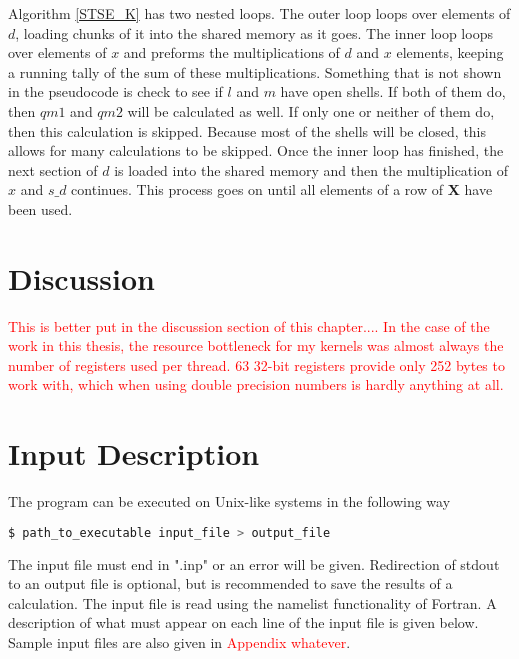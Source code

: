 \documentclass[12pt]{report}
\newcommand{\notetodylan}[1]{\textcolor{red}{#1}} %
\begin{document}
Algorithm \ref{STSE_K} has two nested loops. The outer loop loops over elements of $d$, loading chunks of it into the shared memory as it goes. The inner loop loops over elements of $x$ and preforms the multiplications of $d$ and $x$ elements, keeping a running tally of the sum of these multiplications. Something that is not shown in the pseudocode is check to see if $l$ and $m$ have open shells. If both of them do, then $qm1$ and $qm2$ will be calculated as well. If only one or neither of them do, then this calculation is skipped. Because most of the shells will be closed, this allows for many calculations to be skipped. Once the inner loop has finished, the next section of $d$ is loaded into the shared memory and then the multiplication of $x$ and $s\_d$ continues. This process goes on until all elements of a row of \textbf{X} have been used.

\section{Discussion}

\notetodylan{This is better put in the discussion section of this chapter.... In the case of the work in this thesis, the resource bottleneck for my kernels was almost always the number of registers used per thread. 63 32-bit registers provide only 252 bytes to work with, which when using double precision numbers is hardly anything at all.}

\section{Input Description}\label{inp_des}
The program can be executed on Unix-like systems in the following way
\begin{lstlisting}[language=bash]
	$ path_to_executable input_file > output_file
\end{lstlisting}

The input file must end in ".inp" or an error will be given. Redirection of stdout to an output file is optional, but is recommended to save the results of a calculation. The input file is read using the namelist functionality of Fortran. A description of what must appear on each line of the input file is given below. Sample input files are also given in \notetodylan{Appendix whatever}.
\end{document}
